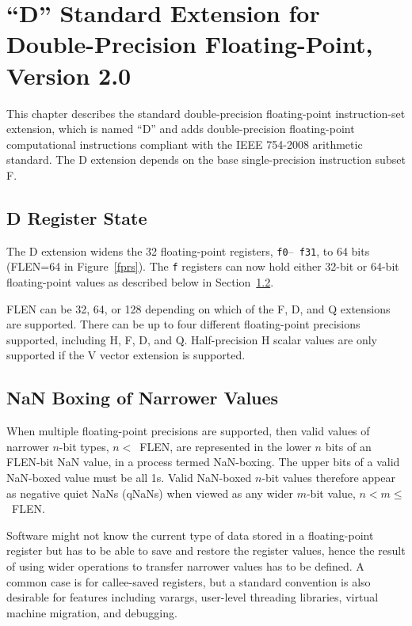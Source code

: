 \chapter{``D'' Standard Extension for Double-Precision Floating-Point,
Version 2.0}

This chapter describes the standard double-precision floating-point
instruction-set extension, which is named ``D'' and adds
double-precision floating-point computational instructions compliant
with the IEEE 754-2008 arithmetic standard.  The D extension depends on
the base single-precision instruction subset F.

\section{D Register State}

The D extension widens the 32 floating-point registers, {\tt f0}--{\tt
  f31}, to 64 bits (FLEN=64 in Figure~\ref{fprs}).  The {\tt f}
registers can now hold either 32-bit or 64-bit floating-point values
as described below in Section~\ref{nanboxing}.

\begin{commentary}
FLEN can be 32, 64, or 128 depending on which of the F, D, and Q
extensions are supported.  There can be up to four different
floating-point precisions supported, including H, F, D, and Q.
Half-precision H scalar values are only supported if the V vector
extension is supported.
\end{commentary}

\section{NaN Boxing of Narrower Values}
\label{nanboxing}

When multiple floating-point precisions are supported, then valid
values of narrower $n$-bit types, \mbox{$n<$ FLEN}, are represented in the
lower $n$ bits of an FLEN-bit NaN value, in a process termed
NaN-boxing.  The upper bits of a valid NaN-boxed value must be all 1s.
Valid NaN-boxed $n$-bit values therefore appear as negative quiet NaNs
(qNaNs) when viewed as any wider $m$-bit value, \mbox{$n < m \leq$ FLEN}.

\begin{commentary}
Software might not know the current type of data stored in a
floating-point register but has to be able to save and restore the
register values, hence the result of using wider operations to
transfer narrower values has to be defined.  A common case is for
callee-saved registers, but a standard convention is also desirable for
features including varargs, user-level threading libraries, virtual
machine migration, and debugging.
\end{commentary}

